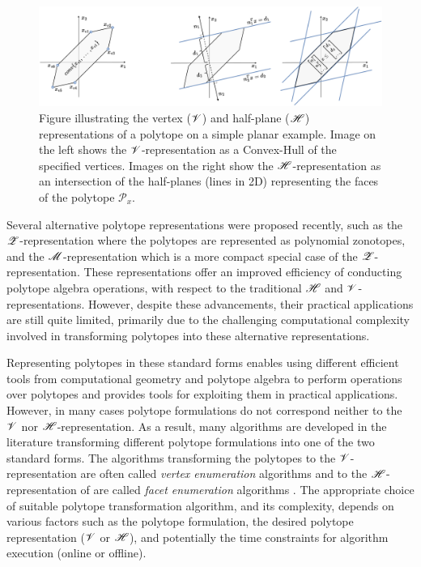 \begin{figure}[!t]
    \centering
    \includegraphics[width=\linewidth]{Chapters/imgs/h_v_rep.pdf}
    \caption{Figure illustrating the vertex ($\mathscr{V}$) and  half-plane ($\mathscr{H}$) representations of a polytope on a simple planar example. Image on the left shows the $\mathscr{V}$-representation as a Convex-Hull of the specified vertices. Images on the right show the $\mathscr{H}$-representation as an intersection of the half-planes (lines in 2D) representing the faces of the polytope $\mathcal{P}_x$.}
    \label{fig:hv_rep}
\end{figure}

Several alternative polytope representations were proposed recently, such as the $\mathscr{Z}$-representation \cite{kochdumper2019representation} where the polytopes are represented as polynomial zonotopes, and the $\mathscr{M}$-representation \cite{sigl2023mrepresentation} which is a more compact special case of the $\mathscr{Z}$-representation. These representations offer an improved efficiency of conducting polytope algebra operations, with respect to the traditional $\mathscr{H}$ and $\mathscr{V}$-representations. However, despite these advancements, their practical applications are still quite limited, primarily due to the challenging computational complexity involved in transforming polytopes into these alternative representations. 

Representing polytopes in these standard forms enables using different efficient tools from computational geometry and polytope algebra to perform operations over polytopes and provides tools for exploiting them in practical applications. However, in many cases polytope formulations do not correspond neither to the $\mathscr{V}$ nor $\mathscr{H}$-representation. As a result, many algorithms are developed in the literature transforming different polytope formulations into one of the two standard forms. The algorithms transforming the polytopes to the $\mathscr{V}$-representation are often called \textit{vertex enumeration} algorithms and to the $\mathscr{H}$-representation of are called \textit{facet enumeration} algorithms \cite{bremner_fukuda_marzetta_1998}. The appropriate choice of suitable polytope transformation algorithm, and its complexity, depends on various factors such as the polytope formulation, the desired polytope representation ($\mathscr{V}$ or $\mathscr{H}$), and potentially the time constraints for algorithm execution (online or offline). 

